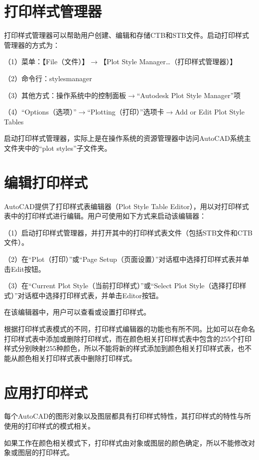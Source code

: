 \section{打印样式管理器}

打印样式管理器可以帮助用户创建、编辑和存储CTB和STB文件。启动打印样式管理器的方式为：

（1）菜单：【File（文件）】$\to$【Plot Style Manager…（打印样式管理器）】

（2）命令行：stylesmanager

（3）其他方式：操作系统中的控制面板$\to$“Autodesk Plot Style Manager”项

（4）“Options（选项）”$\to$“Plotting（打印）”选项卡$\to$Add or Edit Plot Style Tables

启动打印样式管理器，实际上是在操作系统的资源管理器中访问AutoCAD系统主文件夹中的“plot styles”子文件夹。


\section{编辑打印样式}

AutoCAD提供了打印样式表编辑器（Plot Style Table Editor），用以对打印样式表中的打印样式进行编辑。用户可使用如下方式来启动该编辑器：

（1）启动打印样式管理器，并打开其中的打印样式表文件（包括STB文件和CTB文件）。

（2）在“Plot（打印）”或“Page Setup（页面设置）”对话框中选择打印样式表并单击Edit按钮。

（3）在“Current Plot Style（当前打印样式）”或“Select Plot Style（选择打印样式）”对话框中选择打印样式表，并单击Editor按钮。

在该编辑器中，用户可以查看或设置打印样式。

根据打印样式表模式的不同，打印样式编辑器的功能也有所不同。比如可以在命名打印样式表中添加或删除打印样式，而在颜色相关打印样式表中包含的255个打印样式分别映射255种颜色，所以不能将新的样式添加到颜色相关打印样式表，也不能从颜色相关打印样式表中删除打印样式。


\section{应用打印样式}

每个AutoCAD的图形对象以及图层都具有打印样式特性，其打印样式的特性与所使用的打印样式的模式相关。

如果工作在颜色相关模式下，打印样式由对象或图层的颜色确定，所以不能修改对象或图层的打印样式。

